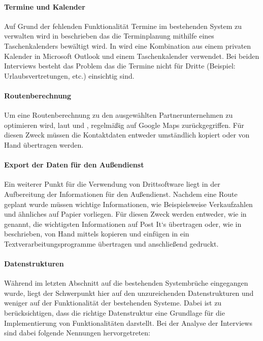 \documentclass[Bachelorarbeit.tex]{subfiles}
\begin{document}
\paragraph{Termine und Kalender}
Auf Grund der fehlenden Funktionalität Termine im bestehenden System zu verwalten wird in  beschrieben das die Terminplanung mithilfe eines Taschenkalenders bewältigt wird. 
In  wird eine Kombination aus einem privaten Kalender in Microsoft Outlook und einem Taschenkalender verwendet. 
Bei beiden Interviews besteht das Problem das die Termine nicht für Dritte (Beispiel: Urlaubsvertretungen, etc.) einsichtig sind.

\paragraph{Routenberechnung}
Um eine Routenberechnung zu den ausgewählten Partnerunternehmen zu optimieren wird, laut  und , regelmäßig auf Google Maps zurückgegriffen. 
Für diesen Zweck müssen die Kontaktdaten entweder umständlich kopiert oder von Hand übertragen werden.

\paragraph{Export der Daten für den Außendienst}
Ein weiterer Punkt für die Verwendung von Drittsoftware liegt in der Aufbereitung der Informationen für den Außendienst.
Nachdem eine Route geplant wurde müssen wichtige Informationen, wie Beispielsweise Verkaufzahlen und ähnliches auf Papier vorliegen. 
Für diesen Zweck werden entweder, wie in  genannt, die wichtigsten Informationen auf Post It`s übertragen oder, wie in  beschrieben, von Hand mittels kopieren und einfügen in ein Textverarbeitungsprogramme übertragen und anschließend gedruckt.

\paragraph{Datenstrukturen}
\label{interviewsAnalyseDatenstrukturen}
Während im letzten Abschnitt auf die bestehenden Systembrüche eingegangen wurde, liegt der Schwerpunkt hier auf den unzureichenden Datenstrukturen und weniger auf der Funktionalität der bestehenden Systeme. 
Dabei ist zu berücksichtigen, dass die richtige Datenstruktur eine Grundlage für die Implementierung von Funktionalitäten darstellt. 
Bei der Analyse der Interviews sind dabei folgende Nennungen hervorgetreten:
\end{document}
